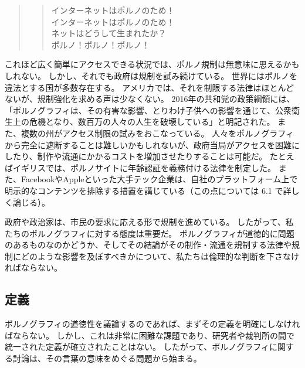 \documentclass[paper=a4,book,openany]{jlreq}
\begin{document}
\begin{quote}

  \begin{verse}
    インターネットはポルノのため！\\インターネットはポルノのため！\\ネットはどうして生まれたか？\\ポルノ！ポルノ！ポルノ！
  \end{verse}
\end{quote}

これほど広く簡単にアクセスできる状況では、ポルノ規制は無意味に思えるかもしれない。
しかし、それでも政府は規制を試み続けている。
世界にはポルノを違法とする国が多数存在する。
アメリカでは、それを制限する法律はほとんどないが、規制強化を求める声は少なくない。
2016年の共和党の政策綱領には、「ポルノグラフィは、その有害な影響、とりわけ子供への影響を通じて、公衆衛生上の危機となり、数百万の人々の人生を破壊している」と明記された\citep{obrien16:_south_carol_lawmak_propos_pornog}。
また、複数の州がアクセス制限の試みをおこなっている\citep{brown17:_hypoc_logic_behin_repub_plans}。
人々をポルノグラフィから完全に遮断することは難しいかもしれないが、政府当局がアクセスを困難にしたり、制作や流通にかかるコストを増加させたりすることは可能だ。
たとえばイギリスでは、ポルノサイトに年齢認証を義務付ける法律を制定した。
また、FacebookやAppleといった大手テック企業は、自社のプラットフォーム上で明示的なコンテンツを排除する措置を講じている（この点については 6.1 で詳しく論じる）。

政府や政治家は、市民の要求に応える形で規制を進めている。
したがって、私たちのポルノグラフィに対する態度は重要だ。
ポルノグラフィが道徳的に問題のあるものなのかどうか、そしてその結論がその制作・流通を規制する法律や規制にどのような影響を及ぼすべきかについて、私たちは倫理的な判断を下さなければならない。

\subsection{定義}

ポルノグラフィの道徳性を議論するのであれば、まずその定義を明確にしなければならない。
しかし、これは非常に困難な課題であり、研究者や裁判所の間で統一された定義が確立されたことはない。
したがって、ポルノグラフィに関する討論は、その言葉の意味をめぐる問題から始まる。
\end{document}
